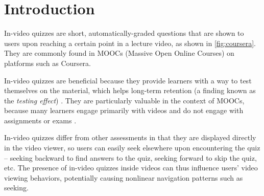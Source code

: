 \documentclass{sigchi}
\begin{document}


\section{Introduction}

In-video quizzes are short, automatically-graded questions that are shown to users upon reaching a certain point in a lecture video, as shown in \autoref{fig:coursera}. They are commonly found in MOOCs (Massive Open Online Courses) on platforms such as Coursera.

In-video quizzes are beneficial because they provide learners with a way to test themselves on the material, which helps long-term retention (a finding known as the \emph{testing effect}) \cite{testingeffect}. They are particularly valuable in the context of MOOCs, because many learners engage primarily with videos and do not engage with assignments or exams \cite{renedisengagement} \cite{ashton}.



In-video quizzes differ from other assessments in that they are displayed directly in the video viewer, so users can easily seek elsewhere upon encountering the quiz -- seeking backward to find answers to the quiz, seeking forward to skip the quiz, etc.
The presence of in-video quizzes inside videos can thus influence users' video viewing behaviors, potentially causing nonlinear navigation patterns such as seeking. %
\end{document}
